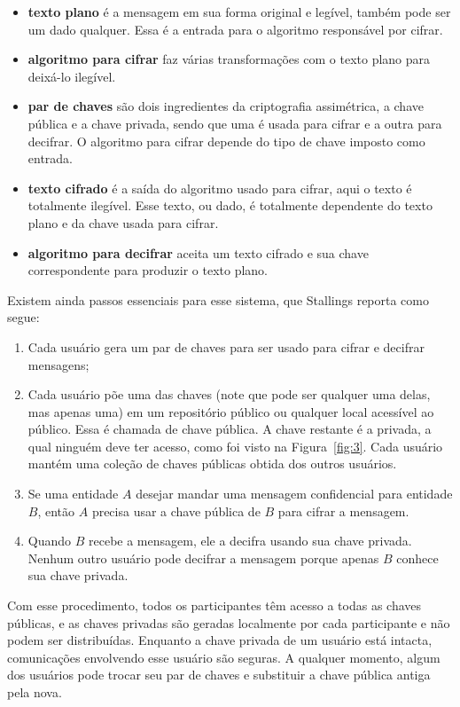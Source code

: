 \documentclass{article}
\begin{document}
\begin{itemize}
  \item \textbf{texto plano} é a mensagem em sua forma original e legível,
      também pode ser um dado qualquer. Essa é a entrada para o algoritmo
        responsável por cifrar.
  \item \textbf{algoritmo para cifrar} faz várias transformações com o texto
      plano para deixá-lo ilegível.
  \item \textbf{par de chaves} são dois ingredientes da criptografia
      assimétrica, a chave pública e a chave privada, sendo que uma é usada
        para cifrar e a outra para decifrar. O algoritmo para cifrar depende do
        tipo de chave imposto como entrada.
  \item \textbf{texto cifrado} é a saída do algoritmo usado para cifrar, aqui o
      texto é totalmente ilegível. Esse texto, ou dado, é totalmente dependente
        do texto plano e da chave usada para cifrar.
  \item \textbf{algoritmo para decifrar} aceita um texto cifrado e sua chave
      correspondente para produzir o texto plano.
\end{itemize}

Existem ainda passos essenciais para esse sistema, que Stallings reporta como
segue:

\begin{enumerate}
  \item Cada usuário gera um par de chaves para ser usado para cifrar e
      decifrar mensagens;
  \item Cada usuário põe uma das chaves (note que pode ser qualquer uma delas,
      mas apenas uma) em um repositório público ou qualquer local acessível ao
        público. Essa é chamada de chave pública. A chave restante é a privada,
        a qual ninguém deve ter acesso, como foi visto na Figura~\ref{fig:3}.
        Cada usuário mantém uma coleção de chaves públicas obtida dos outros
        usuários.
  \item Se uma entidade $A$ desejar mandar uma mensagem confidencial para
      entidade $B$, então $A$ precisa usar a chave pública de $B$ para cifrar a
        mensagem.
  \item Quando $B$ recebe a mensagem, ele a decifra usando sua chave privada.
      Nenhum outro usuário pode decifrar a mensagem porque apenas $B$ conhece
        sua chave privada.
\end{enumerate}

Com esse procedimento, todos os participantes têm acesso a todas as chaves
públicas, e as chaves privadas são geradas localmente por cada participante e
não podem ser distribuídas. Enquanto a chave privada de um usuário está
intacta, comunicações envolvendo esse usuário são seguras. A qualquer momento,
algum dos usuários pode trocar seu par de chaves e substituir a chave pública
antiga pela nova.
\end{document}
